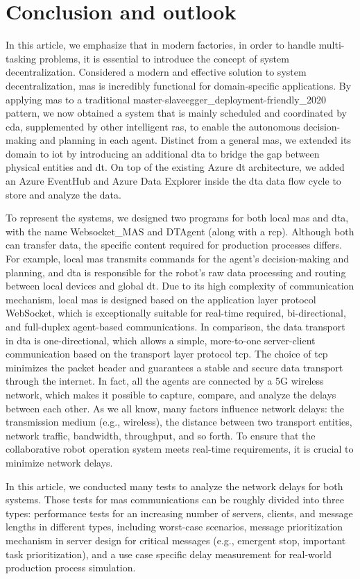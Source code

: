 \chapter{Conclusion and outlook}

In this article, we emphasize that in modern factories, in order to handle 
multi-tasking problems, it is essential to introduce the concept of system 
decentralization. Considered a modern and effective solution to system 
decentralization, \gls{mas} is incredibly functional for domain-specific 
applications. By applying \gls{mas} to a traditional master-slave\gls{egger_deployment-friendly_2020} 
pattern, we now obtained a system that is mainly scheduled and coordinated 
by \gls{cda}, supplemented by other intelligent \gls{ras}, to enable the 
autonomous decision-making and planning in each agent. Distinct from a 
general \gls{mas}, we extended its domain to \gls{iot} by 
introducing an additional \gls{dta} to bridge the gap between physical 
entities and \gls{dt}. On top of the existing Azure \gls{dt} architecture, we 
added an Azure EventHub and Azure Data Explorer inside the \gls{dta} data 
flow cycle to store and analyze the data. 


To represent the systems, we designed two programs for both local 
\gls{mas} and \gls{dta}, with the name Websocket_MAS and DTAgent 
(along with a \gls{rcp}). Although both can transfer data, the 
specific content required for production processes differs. For 
example, local \gls{mas} transmits commands for the agent's decision-making 
and planning, and \gls{dta} is responsible for the robot's raw data processing 
and routing between local devices and global \gls{dt}. Due to its high complexity 
of communication mechanism, local \gls{mas} is designed based on the application 
layer protocol WebSocket, which is exceptionally suitable for real-time required, 
bi-directional, and full-duplex agent-based communications. 
In comparison, the data transport in \gls{dta} is one-directional, which allows 
a simple, more-to-one server-client communication based on the transport layer 
protocol \gls{tcp}. The choice of \gls{tcp} minimizes the packet header and 
guarantees a stable and secure data transport through the internet. In fact, 
all the agents are connected by a 5G wireless network, which makes it possible 
to capture, compare, and analyze the delays between each other. As we all know, 
many factors influence network delays: the transmission medium (e.g., wireless), 
the distance between two transport entities, network traffic, bandwidth, 
throughput, and so forth. To ensure that the collaborative robot operation 
system meets real-time requirements, it is crucial to minimize network delays. 



In this article, we conducted many tests to analyze the network delays 
for both systems. Those tests for \gls{mas} communications can be roughly 
divided into three types: performance tests for an increasing number of servers, 
clients, and message lengths in different types, including worst-case scenarios, 
message prioritization mechanism in server design for critical messages 
(e.g., emergent stop, important task prioritization), and a use case specific 
delay measurement for real-world production process simulation. 
